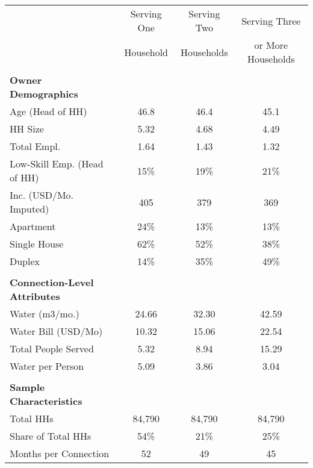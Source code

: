 \begin{tabular}{l*{1}{ccc}}
\hline
\hline 
 &Serving One &Serving Two &Serving Three  \\
 &Household &Households &or More Households  \\
\hline \\
\textbf{Owner Demographics} &\multicolumn{3}{c}{ }\\
\hline
Age (Head of HH) &       46.8  &       46.4  &       45.1   \\
HH Size &       5.32  &       4.68  &       4.49   \\
Total Empl. &       1.64  &       1.43  &       1.32   \\
Low-Skill Emp. (Head of HH) &         15\% &         19\% &         21\%  \\
Inc. (USD/Mo. Imputed) &        405  &        379  &        369   \\
Apartment &         24\% &         13\% &         13\%  \\
Single House &         62\% &         52\% &         38\%  \\
Duplex &         14\% &         35\% &         49\%  \\
\hline \\
\textbf{Connection-Level Attributes} &\multicolumn{3}{c}{ }\\
\hline
Water (m3/mo.) &      24.66  &      32.30  &      42.59   \\
Water Bill (USD/Mo) &      10.32  &      15.06  &      22.54   \\
Total People Served &       5.32  &       8.94  &      15.29   \\
Water per Person &       5.09  &       3.86  &       3.04   \\
\hline \\
\textbf{Sample Characteristics} &\multicolumn{3}{c}{ }\\
\hline
Total HHs &     84,790  &     84,790  &     84,790   \\
Share of Total HHs &         54\% &         21\% &         25\%  \\
Months per Connection &         52  &         49  &         45   \\
\hline
\hline
\end{tabular}